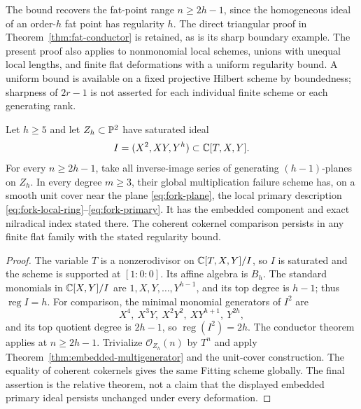 The bound recovers the fat-point range $n\ge2h-1$, since the
homogeneous ideal of an order-$h$ fat point has regularity $h$.
The direct triangular proof in Theorem~\ref{thm:fat-conductor} is
retained, as is its sharp boundary example. The present proof also
applies to nonmonomial local schemes, unions with unequal local
lengths, and finite flat deformations with a uniform regularity
bound. A uniform bound is available on a fixed projective Hilbert
scheme by boundedness; sharpness of $2r-1$ is not asserted for each
individual finite scheme or each generating rank.

\begin{corollary}
\label{cor:global-embedded-multigenerator}
Let $h\ge5$ and let $Z_h\subset\mathbb P^2$ have saturated ideal
\[
 I=(X^2,XY,Y^h)\subset\mathbb C[T,X,Y].
\]
For every $n\ge2h-1$, take all inverse-image series of generating
$(h-1)$-planes on $Z_h$. In every degree $m\ge3$, their global
multiplication failure scheme has, on a smooth unit cover near the
plane \eqref{eq:fork-plane}, the local primary description
\eqref{eq:fork-local-ring}--\eqref{eq:fork-primary}. It has the
embedded component and exact nilradical index stated there.
The coherent cokernel comparison persists in any finite flat
family with the stated regularity bound.
\end{corollary}
\begin{proof}
The variable $T$ is a nonzerodivisor on $\mathbb C[T,X,Y]/I$, so $I$ is
saturated and the scheme is supported at $[1:0:0]$. Its affine
algebra is $B_h$. The standard monomials in $\mathbb C[X,Y]/I$ are
$1,X,Y,\ldots,Y^{h-1}$, and its top degree is $h-1$; thus
$\operatorname{reg}I=h$. For comparison, the minimal monomial
generators of $I^2$ are
\[
 X^4,\ X^3Y,\ X^2Y^2,\ XY^{h+1},\ Y^{2h},
\]
and its top quotient degree is $2h-1$, so
$\operatorname{reg}(I^2)=2h$. The conductor theorem applies at
$n\ge2h-1$. Trivialize $\mathcal O_{Z_h}(n)$ by $T^n$ and apply
Theorem~\ref{thm:embedded-multigenerator} and the unit-cover
construction. The equality of coherent cokernels gives the same
Fitting scheme globally. The final assertion is the relative
theorem, not a claim that the displayed embedded primary ideal
persists unchanged under every deformation.
\end{proof}
